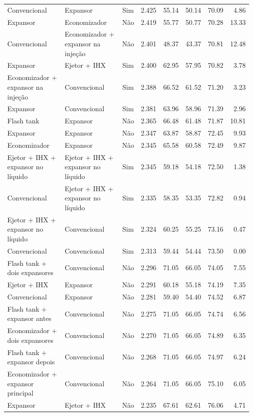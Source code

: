 {\begin{tabular}{llcrrrrr}
Convencional & Expansor & Sim & 2.425 & 55.14 & 50.14 & 70.09 & 4.86 \\
Expansor & Economizador & Não & 2.419 & 55.77 & 50.77 & 70.28 & 13.33 \\
Convencional & Economizador + expansor na injeção & Não & 2.401 & 48.37 & 43.37 & 70.81 & 12.48 \\
Expansor & Ejetor + IHX & Sim & 2.400 & 62.95 & 57.95 & 70.82 & 3.78 \\
Economizador + expansor na injeção & Convencional & Sim & 2.388 & 66.52 & 61.52 & 71.20 & 3.23 \\
Expansor & Convencional & Sim & 2.381 & 63.96 & 58.96 & 71.39 & 2.96 \\
Flash tank & Expansor & Não & 2.365 & 66.48 & 61.48 & 71.87 & 10.81 \\
Expansor & Expansor & Não & 2.347 & 63.87 & 58.87 & 72.45 & 9.93 \\
Economizador & Expansor & Não & 2.345 & 65.58 & 60.58 & 72.49 & 9.87 \\
Ejetor + IHX + expansor no líquido & Ejetor + IHX + expansor no líquido & Sim & 2.345 & 59.18 & 54.18 & 72.50 & 1.38 \\
Convencional & Ejetor + IHX + expansor no líquido & Sim & 2.335 & 58.35 & 53.35 & 72.82 & 0.94 \\
Ejetor + IHX + expansor no líquido & Convencional & Sim & 2.324 & 60.25 & 55.25 & 73.16 & 0.47 \\
Convencional & Convencional & Sim & 2.313 & 59.44 & 54.44 & 73.50 & 0.00 \\
Flash tank + dois expansores & Convencional & Não & 2.296 & 71.05 & 66.05 & 74.05 & 7.55 \\
Ejetor + IHX & Expansor & Não & 2.291 & 60.18 & 55.18 & 74.19 & 7.35 \\
Convencional & Expansor & Não & 2.281 & 59.40 & 54.40 & 74.52 & 6.87 \\
Flash tank + expansor antes & Convencional & Não & 2.275 & 71.05 & 66.05 & 74.74 & 6.56 \\
Economizador + dois expansores & Convencional & Não & 2.270 & 71.05 & 66.05 & 74.89 & 6.35 \\
Flash tank + expansor depois & Convencional & Não & 2.268 & 71.05 & 66.05 & 74.97 & 6.24 \\
Economizador + expansor principal & Convencional & Não & 2.264 & 71.05 & 66.05 & 75.10 & 6.05 \\
Expansor & Ejetor + IHX & Não & 2.235 & 67.61 & 62.61 & 76.06 & 4.71 \\

\end{tabular}}
